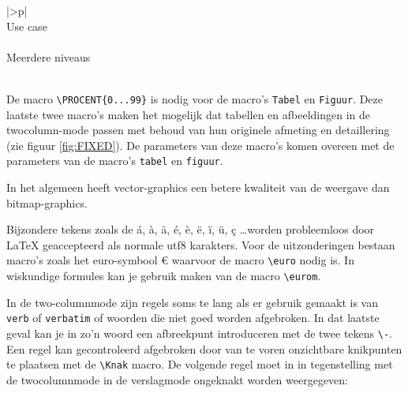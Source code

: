 		\begin{center}
			
		\end{center}
		
		\begin{center}
			
		\end{center}
		
		
		
		
		\begin{center}
			\begin{tabular}{|>\C p{}|}
				\hline
				~\\
				Use case\\
				~\\
				Meerdere niveaus\\
				~\\
				\hline
			\end{tabular}
		\end{center}
		
		De macro \verb!\PROCENT{0...99}! is nodig voor de macro's \verb!Tabel!
		en \verb!Figuur!. Deze laatste twee macro's maken het mogelijk dat
		tabellen en afbeeldingen in de twocolumn-mode passen met behoud van
		hun originele afmeting en detaillering (zie
		figuur \ref{fig:FIXED}). De parameters van deze macro's komen overeen
		met de parameters van de macro's \verb!tabel! en \verb!figuur!.
		
		
		
		In het algemeen heeft vector-graphics een betere kwaliteit van de
		weergave dan bitmap-graphics.
		
		
		
		Bijzondere tekens zoals de á, à, ä, é, è, ë, ï, ü, ç \ldots worden
		probleemloos door \LaTeX{} geaccepteerd als normale utf8
		karakters. Voor de uitzonderingen bestaan macro's zoals het
		euro-symbool \euro{} waarvoor de macro \verb!\euro! nodig is. In
		wiskundige formules kan je gebruik maken van de macro \verb!\eurom!.
		
		
		In de two-columnmode zijn regels soms te lang als er gebruik gemaakt
		is van \verb!verb! of \verb!verbatim! of woorden die niet goed worden
		afgebroken. In dat laatste geval kan je in zo'n woord een afbreekpunt
		introduceren met de twee tekens \verb!\-!. Een regel kan gecontroleerd
		afgebroken door van te voren onzichtbare knikpunten te plaatsen met de
		\verb!\Knak! macro. De volgende regel moet in in tegenstelling met de
		twocolumnmode in de verslagmode ongeknakt worden weergegeven:
		
